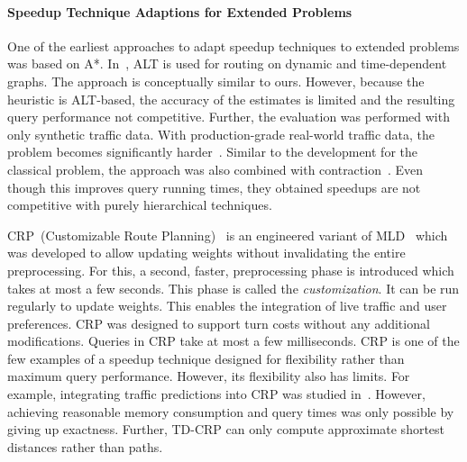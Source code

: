 \documentclass[manuscript,review]{acmart}
\begin{document}
\paragraph{Speedup Technique Adaptions for Extended Problems}
One of the earliest approaches to adapt speedup techniques to extended problems was based on A*.
In~\cite{dw-lbrdg-07}, ALT is used for routing on dynamic and time-dependent graphs.
The approach is conceptually similar to ours.
However, because the heuristic is ALT-based, the accuracy of the estimates is limited and the resulting query performance not competitive.
Further, the evaluation was performed with only synthetic traffic data.
With production-grade real-world traffic data, the problem becomes significantly harder~\cite{swz-sfert-21}.
Similar to the development for the classical problem, the approach was also combined with contraction~\cite{ndls-bastd-12,dn-crdtd-12}.
Even though this improves query running times, they obtained speedups are not competitive with purely hierarchical techniques.

CRP~(Customizable Route Planning)~\cite{dgpw-crprn-13} is an engineered variant of MLD~\cite{swz-umlgt-02} which was developed to allow updating weights without invalidating the entire preprocessing.
For this, a second, faster, preprocessing phase is introduced which takes at most a few seconds.
This phase is called the \emph{customization}.
It can be run regularly to update weights.
This enables the integration of live traffic and user preferences.
CRP was designed to support turn costs without any additional modifications.
Queries in CRP take at most a few milliseconds.
CRP is one of the few examples of a speedup technique designed for flexibility rather than maximum query performance.
However, its flexibility also has limits.
For example, integrating traffic predictions into CRP was studied in~\cite{bdpw-dtdrp-16}.
However, achieving reasonable memory consumption and query times was only possible by giving up exactness.
Further, TD-CRP can only compute approximate shortest distances rather than paths.
\end{document}
